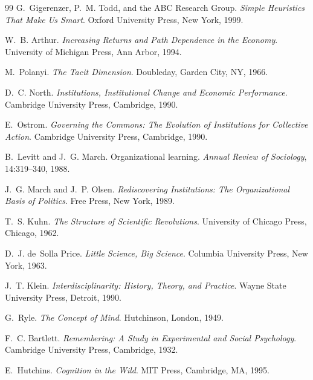 \documentclass[12pt, a4paper]{article}
\theoremstyle{essaystyle}
\begin{document}
\begin{thebibliography}{99}
G.~Gigerenzer, P.~M. Todd, and the {ABC} Research Group.
\newblock \textit{Simple Heuristics That Make Us Smart}.
\newblock Oxford University Press, New York, 1999.

W.~B. Arthur.
\newblock \textit{Increasing Returns and Path Dependence in the Economy}.
\newblock University of Michigan Press, Ann Arbor, 1994.

M.~Polanyi.
\newblock \textit{The Tacit Dimension}.
\newblock Doubleday, Garden City, NY, 1966.

D.~C. North.
\newblock \textit{Institutions, Institutional Change and Economic Performance}.
\newblock Cambridge University Press, Cambridge, 1990.

E.~Ostrom.
\newblock \textit{Governing the Commons: The Evolution of Institutions for
  Collective Action}.
\newblock Cambridge University Press, Cambridge, 1990.

B.~Levitt and J.~G. March.
\newblock Organizational learning.
\newblock \textit{Annual Review of Sociology}, 14:319--340, 1988.

J.~G. March and J.~P. Olsen.
\newblock \textit{Rediscovering Institutions: The Organizational Basis of Politics}.
\newblock Free Press, New York, 1989.

T.~S. Kuhn.
\newblock \textit{The Structure of Scientific Revolutions}.
\newblock University of Chicago Press, Chicago, 1962.

D.~J. de~Solla Price.
\newblock \textit{Little Science, Big Science}.
\newblock Columbia University Press, New York, 1963.

J.~T. Klein.
\newblock \textit{Interdisciplinarity: History, Theory, and Practice}.
\newblock Wayne State University Press, Detroit, 1990.

G.~Ryle.
\newblock \textit{The Concept of Mind}.
\newblock Hutchinson, London, 1949.

F.~C. Bartlett.
\newblock \textit{Remembering: A Study in Experimental and Social Psychology}.
\newblock Cambridge University Press, Cambridge, 1932.

E.~Hutchins.
\newblock \textit{Cognition in the Wild}.
\newblock MIT Press, Cambridge, MA, 1995.


\end{thebibliography}
\end{document}
